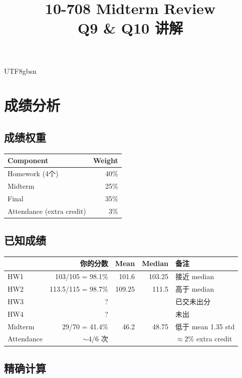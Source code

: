 \documentclass[11pt]{article}
\title{10-708 Midterm Review \\ Q9 \& Q10 讲解}
\author{}
\date{}
\begin{document}
\begin{CJK}{UTF8}{gbsn}
\maketitle

\section{成绩分析}

\subsection{成绩权重}

\begin{center}
\begin{tabular}{l|r}
  Component & Weight \\
  \hline
  Homework (4个) & 40\% \\
  Midterm & 25\% \\
  Final & 35\% \\
  Attendance (extra credit) & 3\% \\
\end{tabular}
\end{center}

\subsection{已知成绩}

\begin{center}
\begin{tabular}{l|r|r|r|l}
  & 你的分数 & Mean & Median & 备注 \\
  \hline
  HW1 & 103/105 = 98.1\% & 101.6 & 103.25 & 接近 median \\
  HW2 & 113.5/115 = 98.7\% & 109.25 & 111.5 & 高于 median \\
  HW3 & ? & & & 已交未出分 \\
  HW4 & ? & & & 未出 \\
  \hline
  Midterm & 29/70 = 41.4\% & 46.2 & 48.75 & 低于 mean 1.35 std \\
  \hline
  Attendance & $\sim$4/6 次 & & & $\approx 2\%$ extra credit \\
\end{tabular}
\end{center}

\subsection{精确计算}


\end{CJK}
\end{document}

